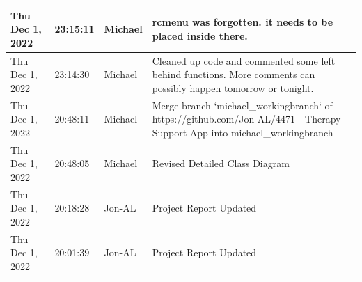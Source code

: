 \documentclass[11pt]{article}
\begin{document}
\begin{center}
\begin{longtable}{|p{2.7cm}|l|p{2cm}|p{8cm}|}
           \hline Thu Dec 1, 2022                            & 23:15:11                           & Michael                                 & rcmenu was forgotten. it needs to be placed inside there.                                                                                                                                                                                                                                                  \\
           \hline Thu Dec 1, 2022                            & 23:14:30                           & Michael                                 & Cleaned up code and commented some left behind functions. More comments can possibly happen tomorrow or tonight.                                                                                                                                                                                           \\
           \hline Thu Dec 1, 2022                            & 20:48:11                           & Michael                                 & Merge branch `michael\_workingbranch` of https://github.com/Jon-AL/4471---Therapy-Support-App into michael\_workingbranch                                                                                                                                                                                    \\
           \hline Thu Dec 1, 2022                            & 20:48:05                           & Michael                                 & Revised Detailed Class Diagram                                                                                                                                                                                                                                                                             \\
           \hline Thu Dec 1, 2022                            & 20:18:28                           & Jon-AL                                  & Project Report Updated                                                                                                                                                                                                                                                                                     \\
           \hline Thu Dec 1, 2022                            & 20:01:39                           & Jon-AL                                  & Project Report Updated                                                                                                                                                                                                                                                                                     \\

\end{longtable}
\end{center}
\end{document}
